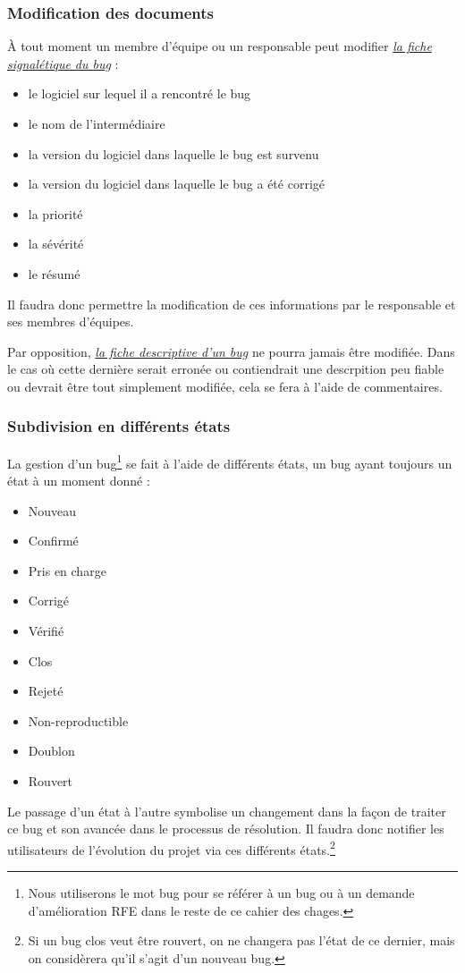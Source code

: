 \documentclass{article}[12pt]
\begin{document}
\subsubsection{Modification des documents}
À tout moment un membre d'équipe ou un responsable peut modifier
\hyperref[sec:sign]{ \textit{la fiche signalétique du bug}} :
\begin{itemize}
	\item le logiciel sur lequel il a rencontré le bug
	\item le nom de l'intermédiaire
	\item la version du logiciel dans laquelle le bug est survenu
	\item la version du logiciel dans laquelle le bug a été corrigé
	\item la priorité
	\item la sévérité
	\item le résumé
\end{itemize}
Il faudra donc permettre la modification de ces informations par le responsable et ses membres d'équipes. \\ \par
Par opposition, \hyperref[sec:desc]{ \textit{la fiche descriptive d'un bug}} ne pourra jamais être modifiée. Dans le cas où cette dernière serait erronée ou contiendrait une descrpition peu fiable ou devrait être tout simplement modifiée, cela se fera à l'aide de commentaires.
\subsubsection{Subdivision en différents états}
La gestion d'un bug\footnote{Nous utiliserons le mot \og bug \fg pour se référer à un bug ou à un demande d'amélioration RFE dans le reste de ce cahier des chages.} se fait à l'aide de différents états, un bug ayant toujours un état à un moment donné :
\begin{itemize}
	\item Nouveau
	\item Confirmé
	\item Pris en charge
	\item Corrigé
	\item Vérifié
	\item Clos
	\item Rejeté
	\item Non-reproductible
	\item Doublon
	\item Rouvert
\end{itemize}
Le passage d'un état à l'autre symbolise un changement dans la façon de traiter ce bug et son avancée dans le processus de résolution. Il faudra donc notifier les utilisateurs de l'évolution du projet via ces différents états.\footnote{Si un bug clos veut être rouvert, on ne changera pas l'état de ce dernier, mais on considèrera qu'il s'agit d'un nouveau bug.}
\end{document}
